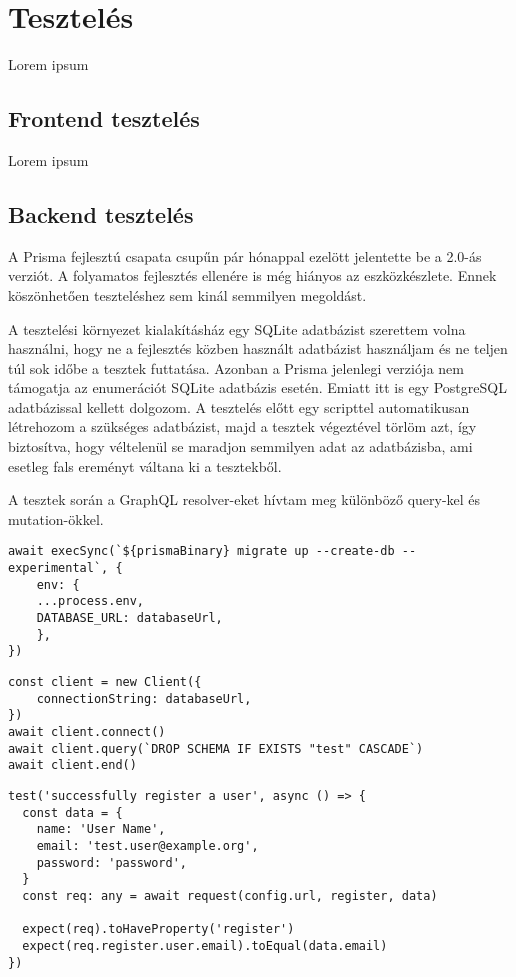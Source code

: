 \chapter{Tesztelés}

Lorem ipsum

\section{Frontend tesztelés}
Lorem ipsum

\section{Backend tesztelés}
A Prisma fejlesztú csapata csupűn pár hónappal ezelött jelentette be a 2.0-ás verziót.
A folyamatos fejlesztés ellenére is még hiányos az eszközkészlete.
Ennek köszönhetően teszteléshez sem kinál semmilyen megoldást.

A tesztelési környezet kialakításház egy SQLite adatbázist szerettem volna használni, hogy ne a fejlesztés közben használt adatbázist használjam és ne teljen túl sok időbe a tesztek futtatása.
Azonban a Prisma jelenlegi verziója nem támogatja az enumerációt SQLite adatbázis esetén.
Emiatt itt is egy PostgreSQL adatbázissal kellett dolgozom.
A tesztelés előtt egy scripttel automatikusan létrehozom a szükséges adatbázist, majd a tesztek végeztével törlöm azt, így biztosítva, hogy véltelenül se maradjon semmilyen adat az adatbázisba, ami esetleg fals ereményt váltana ki a tesztekből.

A tesztek során a GraphQL resolver-eket hívtam meg különböző query-kel és mutation-ökkel.

\begin{lstlisting}[style=ES6, caption={Teszt atadbázis migrció}]
await execSync(`${prismaBinary} migrate up --create-db --experimental`, {
    env: {
    ...process.env,
    DATABASE_URL: databaseUrl,
    },
})
\end{lstlisting}

\begin{lstlisting}[style=ES6, caption=Teszt adatbázis törlése]    
const client = new Client({
    connectionString: databaseUrl,
})
await client.connect()
await client.query(`DROP SCHEMA IF EXISTS "test" CASCADE`)
await client.end()
\end{lstlisting}


\begin{lstlisting}[style=ES6, caption=Regisztráció első teszt eset]    
test('successfully register a user', async () => {
  const data = {
    name: 'User Name',
    email: 'test.user@example.org',
    password: 'password',
  }
  const req: any = await request(config.url, register, data)

  expect(req).toHaveProperty('register')
  expect(req.register.user.email).toEqual(data.email)
})
\end{lstlisting}
